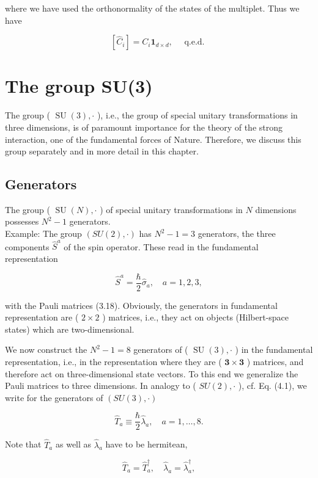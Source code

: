 \documentclass[10pt, letterpaper]{article}
\begin{document}
where we have used the orthonormality of the states of the multiplet. Thus we have

$$
\left[\hat{C}_{i}\right]=C_{i} \mathbf{1}_{d \times d}, \quad \text { q.e.d. }
$$

\pagebreak


\section{The group SU(3)}
The group ( $\operatorname{SU}(3), \cdot$ ), i.e., the group of special unitary transformations in three dimensions, is of paramount importance for the theory of the strong interaction, one of the fundamental forces of Nature. Therefore, we discuss this group separately and in more detail in this chapter.



\subsection{Generators}


The group ( $\operatorname{SU}(N), \cdot$ ) of special unitary transformations in $N$ dimensions possesses $N^{2}-1$ generators.\\
Example: The group $(S U(2), \cdot)$ has $N^{2}-1=3$ generators, the three components $\hat{S}^{a}$ of the spin operator. These read in the fundamental representation

$$
\hat{S}^{a}=\frac{\hbar}{2} \hat{\sigma}_{a}, \quad a=1,2,3,
$$

with the Pauli matrices (3.18). Obviously, the generators in fundamental representation are ( $2 \times 2$ ) matrices, i.e., they act on objects (Hilbert-space states) which are two-dimensional.

We now construct the $N^{2}-1=8$ generators of ( $\operatorname{SU}(3), \cdot$ ) in the fundamental representation, i.e., in the representation where they are ( $\mathbf{3} \times \mathbf{3}$ ) matrices, and therefore act on three-dimensional state vectors. To this end we generalize the Pauli matrices to three dimensions. In analogy to ( $S U(2), \cdot$ ), cf. Eq. (4.1), we write for the generators of $(S U(3), \cdot)$

$$
\hat{T}_{a} \equiv \frac{\hbar}{2} \hat{\lambda}_{a}, \quad a=1, \ldots, 8 .
$$

Note that $\hat{T}_{a}$ as well as $\hat{\lambda}_{a}$ have to be hermitean,

$$
\hat{T}_{a}=\hat{T}_{a}^{\dagger}, \quad \hat{\lambda}_{a}=\hat{\lambda}_{a}^{\dagger},
$$
\end{document}
